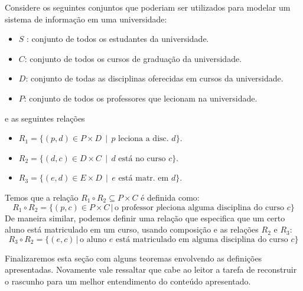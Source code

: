 \begin{Example}
Considere os seguintes conjuntos que poderiam ser utilizados para
modelar um sistema de informação em uma universidade:
\begin{itemize}
  \item $S$ : conjunto de todos os estudantes da universidade.
  \item $C$: conjunto de todos os cursos de graduação da universidade.
  \item $D$: conjunto de todas as disciplinas oferecidas em cursos da
    universidade.
  \item $P$: conjunto de todos os professores que lecionam na universidade.
\end{itemize}
e as seguintes relações
\begin{itemize}
	\item $R_1 = \{(p,d)\in P \times D \,\mid\,\text{$p$ leciona a disc. } d\}$.
	\item $R_2 = \{(d,c)\in D \times C\,\mid\,\text{$d$ est\'a no curso $c$}\}$.
	\item $R_3 = \{(e,d)\in E\times D\,\mid\,\text{$e$ est\'a matr. em $d$}\}$.
\end{itemize}
Temos que a relação $R_1 \circ R_2 \subseteq P \times C$ é definida
como:
\[
R_1 \circ R_2 =\{(p,c) \in P \times C \,|\,\text{o professor $p$
  leciona alguma disciplina do curso $c$}\}
\]
De maneira similar, podemos definir uma relação que especifica que um
certo aluno está matriculado em um curso, usando composição e as
relações $R_2$ e $R_3$:
\[
R_3 \circ R_2 =\{(e,c)\,|\,\text{o aluno $e$ está matriculado em
  alguma disciplina do curso $c$}\}
\]
\end{Example}

Finalizaremos esta seção com alguns teoremas envolvendo as definições
apresentadas. Novamente vale ressaltar que cabe ao leitor a tarefa de
reconstruir o rascunho para um melhor entendimento do conteúdo
apresentado.

